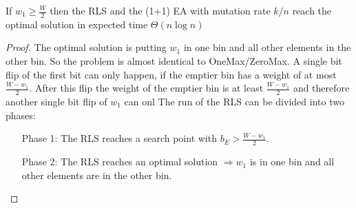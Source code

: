 \begin{theorem}\label{theo:OneMaxResult}
    If $w_1 \ge \frac W 2$  then the RLS and the (1+1) EA with mutation rate $k/n$ reach the optimal solution in expected time $\Theta(n\log{}n)$
\end{theorem}
\begin{proof}
    The optimal solution is putting $w_1$ in one bin and all other elements in the other bin.
    So the problem is almost identical to OneMax/ZeroMax.
    A single bit flip of the first bit can only happen, if the emptier bin has a weight of at most $\frac {W-w_1}{2}$.
    After this flip the weight of the emptier bin is at least $\frac {W-w_1}{2}$ and therefore another single bit flip of $w_1$ can onl
    The run of the RLS can be divided into two phases:
    \begin{itemize}
        \item[Phase 1:] The RLS reaches a search point with $b_E > \frac {W-w_1}{2}$.
        \item[Phase 2:] The RLS reaches an optimal solution $\Rightarrow w_1$ is in one bin and all other elements are in the other bin.
    \end{itemize}


\end{proof}
